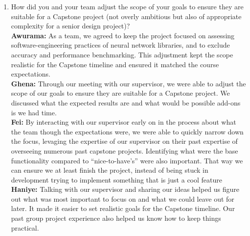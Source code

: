 \documentclass{article}
\begin{document}
\begin{enumerate}
    \item How did you and your team adjust the scope of your goals to ensure
    they are suitable for a Capstone project (not overly ambitious but also of
    appropriate complexity for a senior design project)? \\
    \textbf{Awurama:} As a team, we agreed to keep the project focused on assessing software-engineering practices of neural network libraries, and to exclude accuracy and performance benchmarking. This adjustment kept the scope realistic for the Capstone timeline and ensured it matched the course expectations.  
    \\\textbf{Ghena:} Through our meeting with our supervisor, we were able to adjust the scope of our goals to ensure they are suitable for a Capstone project. We discussed what the expected results are and what would be possible add-ons is we had time.
    \\\textbf{Fei:} By interacting with our supervisor early on in the process about what the team though the expectations were, we were able to quickly narrow down the focus, levaging the expertise of our supervisor on their past expertise of overseeing numerous past capstone projects. Identifying what were the base functionality compared to “nice-to-have’s” were also important. That way we can ensure we at least finish the project, instead of being stuck in development trying to implement something that is just a cool feature
    \\\textbf{Haniye:} Talking with our supervisor and sharing our ideas helped us figure out what was most important to focus on and what we could leave out for later. It made it easier to set realistic goals for the Capstone timeline. Our past group project experience also helped us know how to keep things practical.

\end{enumerate}
\end{document}
